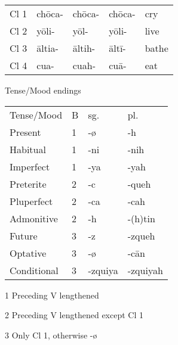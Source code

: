 \documentclass[12pt]{beamer}
\newcommand{\nah}[1]{\textcolor{nahgrn}{#1}}
\newcommand{\trs}[1]{\textcolor{nahblu}{#1}}
\begin{document}
\begin{frame}
\begin{columns}[t]
\begin{column}{.18\linewidth}
\begin{example}
\begin{tabular}{lllll}
          Cl 1 & \nah{chōca-} & \nah{chōca-} & \nah{chōca-} & \trs{cry}   \\
          Cl 2 & \nah{yōli-}  & \nah{yōl-}   & \nah{yōli-}  & \trs{live}  \\
          Cl 3 & \nah{āltia-} & \nah{āltih-} & \nah{āltī-}  & \trs{bathe} \\
          Cl 4 & \nah{cua-}   & \nah{cuah-}  & \nah{cuā-}   & \trs{eat}
        \end{tabular}
      \end{example}
      \begin{block}{Tense/Mood endings}
        \begin{threeparttable}
          \begin{tabular}{llll}
            Tense/Mood  & B & sg.                & pl.                    \\
            Present     & 1 & \nah{-ø}           & \nah{-h}               \\
            Habitual    & 1 & \nah{-ni}\tnote{1} & \nah{-nih}\tnote{1}    \\
            Imperfect   & 1 & \nah{-ya}\tnote{2} & \nah{-yah}             \\
            Preterite   & 2 & \nah{-c}\tnote{3}  & \nah{-queh}            \\
            Pluperfect  & 2 & \nah{-ca}          & \nah{-cah}             \\
            Admonitive  & 2 & \nah{-h}\tnote{3}  & \nah{-(h)tin}\tnote{3} \\
            Future      & 3 & \nah{-z}           & \nah{-zqueh}           \\
            Optative    & 3 & \nah{-ø}           & \nah{-cān}             \\
            Conditional & 3 & \nah{-zquiya}      & \nah{-zquiyah}
          \end{tabular}
          \begin{tablenotes}
            \item[1] Preceding V lengthened
            \item[2] Preceding V lengthened except Cl 1
            \item[3] Only Cl 1, otherwise \nah{-ø}
          \end{tablenotes}
        \end{threeparttable}
      \end{block}
    \end{column}
    \begin{column}{.18\linewidth}

\end{column}
\end{columns}
\end{frame}
\end{document}

